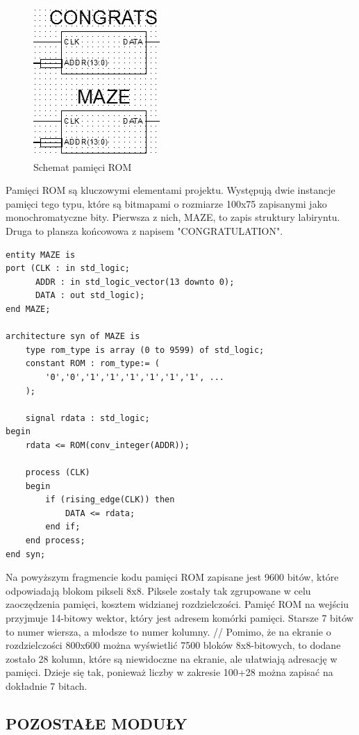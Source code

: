 \documentclass[11pt]{article}
\begin{document}
\begin{figure}[H]
\center
\includegraphics[scale=1]{ROM.png} 
\caption{Schemat pamięci ROM}
\end{figure}

Pamięci ROM są kluczowymi elementami projektu. Występują dwie instancje pamięci tego typu, które są bitmapami o rozmiarze 100x75 zapisanymi jako monochromatyczne bity.
Pierwsza z nich, MAZE, to zapis struktury labiryntu.
Druga to plansza końcowowa z napisem "CONGRATULATION".

\begin{lstlisting}
entity MAZE is
port (CLK : in std_logic;
      ADDR : in std_logic_vector(13 downto 0);
      DATA : out std_logic);
end MAZE;

architecture syn of MAZE is
    type rom_type is array (0 to 9599) of std_logic;
    constant ROM : rom_type:= (
        '0','0','1','1','1','1','1','1', ...
    );

    signal rdata : std_logic;
begin
    rdata <= ROM(conv_integer(ADDR));

    process (CLK)
    begin
        if (rising_edge(CLK)) then
            DATA <= rdata;
        end if;
    end process;
end syn;
\end{lstlisting}

Na powyższym fragmencie kodu pamięci ROM zapisane jest 9600 bitów, które odpowiadają blokom pikseli 8x8.
Piksele zostały tak zgrupowane w celu zaoczędzenia pamięci, kosztem widzianej rozdzielczości.
Pamięć ROM na wejściu przyjmuje 14-bitowy wektor, który jest adresem komórki pamięci.
Starsze 7 bitów to numer wiersza, a młodsze to numer kolumny.
//
Pomimo, że na ekranie o rozdzielczości 800x600 można wyświetlić 7500 bloków 8x8-bitowych, to dodane zostało 28 kolumn, które są niewidoczne na ekranie, ale ułatwiają adresację w pamięci.
Dzieje się tak, ponieważ liczby w zakresie 100+28 można zapisać na dokładnie 7 bitach.

\subsection{POZOSTAŁE MODUŁY}
\end{document}
